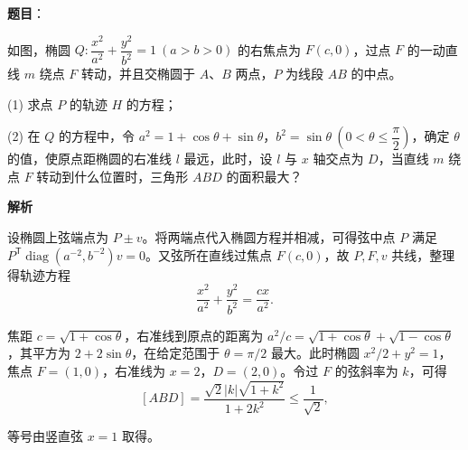 \begin{answer}

\textbf{题目}：

如图，椭圆 $Q:\dfrac{x^2}{a^2}+\dfrac{y^2}{b^2}=1\ (a>b>0)$ 的右焦点为 $F(c,0)$，过点 $F$ 的一动直线 $m$ 绕点 $F$ 转动，并且交椭圆于 $A\text{、}B$ 两点，$P$ 为线段 $AB$ 的中点。

(1) 求点 $P$ 的轨迹 $H$ 的方程；

(2) 在 $Q$ 的方程中，令 $a^2=1+\cos\theta+\sin\theta\text{，}b^2=\sin\theta\ \left(0<\theta\leqslant\dfrac\pi2\right)$，确定 $\theta$ 的值，使原点距椭圆的右准线 $l$ 最远，此时，设 $l$ 与 $x$ 轴交点为 $D$，当直线 $m$ 绕点 $F$ 转动到什么位置时，三角形 $ABD$ 的面积最大？
\nopagebreak[4]
\begin{center}\end{center}
\nopagebreak[4]
\textbf{解析}


设椭圆上弦端点为 $P\pm v$。将两端点代入椭圆方程并相减，可得弦中点 $P$ 满足 $P^{\mathsf T}\operatorname{diag}(a^{-2},b^{-2})v=0$。又弦所在直线过焦点 $F(c,0)$，故 $P,F,v$ 共线，整理得轨迹方程
\nopagebreak[4]
\[
\frac{x^2}{a^2}+\frac{y^2}{b^2}=\frac{cx}{a^2}.
\]


焦距 $c=\sqrt{1+\cos\theta}$，右准线到原点的距离为 $a^2/c=\sqrt{1+\cos\theta}+\sqrt{1-\cos\theta}$，其平方为 $2+2\sin\theta$，在给定范围于 $\theta=\pi/2$ 最大。此时椭圆 $x^2/2+y^2=1$，焦点 $F=(1,0)$，右准线为 $x=2$，$D=(2,0)$。令过 $F$ 的弦斜率为 $k$，可得
\nopagebreak[4]
\[
[ABD]=\frac{\sqrt2|k|\sqrt{1+k^2}}{1+2k^2}\le\frac1{\sqrt2},
\]

等号由竖直弦 $x=1$ 取得。



\end{answer}
